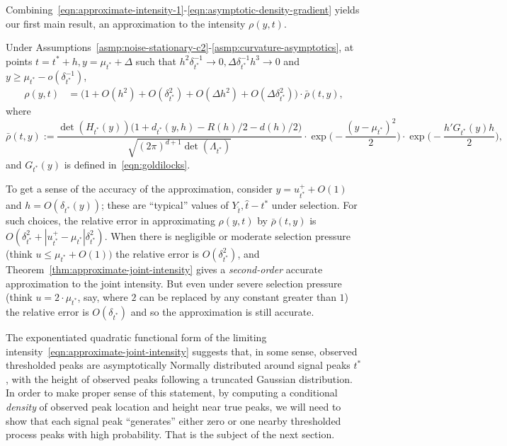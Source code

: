 \documentclass{article}
\newcommand{\ag}[1]{{\bf{{\red{[{AG: #1}]}}}}}
\begin{document}
	Combining~\eqref{eqn:approximate-intensity-1}-\eqref{eqn:asymptotic-density-gradient} yields our first main result, an approximation to the intensity $\rho(y,t)$.
	\begin{theorem}
		\label{thm:approximate-joint-intensity}
		Under Assumptions~\ref{asmp:noise-stationary-c2}-\ref{asmp:curvature-asymptotics}, at points $t = t^{\ast} + h, y = \mu_{t^*} + \Delta$ such that $h^2 \delta_{t^*}^{-1} \to 0, \Delta \delta_{t^*}^{-1}h^3 \to 0$ and $y \geq \mu_{t^*} - o(\delta_{t^*}^{-1})$,
		\begin{align*}
			\rho(y,t) & = \Big(1 + O(h^2) + O(\delta_{t^*}^2) + O(\Delta h^2) + O(\Delta\delta_{t^*}^2)\Big)\cdot\bar{\rho}(t,y),
		\end{align*}
		where
		\begin{equation}
			\label{eqn:approximate-joint-intensity}
			\bar{\rho}(t,y) := \frac{\det(H_{t^*}(y))\Big(1 + d_{t^*}(y,h) - R(h)/2 - d(h)/2\Big)}{\sqrt{(2\pi)^{d + 1}\det(\Lambda_{t^*})}}\cdot\exp\Big(-\frac{(y - \mu_{t^*})^2}{2}\Big) \cdot \exp\bigg(-\frac{h' G_{t^*}(y)h}{2}\bigg),
		\end{equation}
		and $G_{t^*}(y)$ is defined in~\eqref{eqn:goldilocks}.
	\end{theorem}
	To get a sense of the accuracy of the approximation, consider $y = u_{t^*}^{+} + O(1)$ and $h = O(\delta_{t^*}(y))$; these are ``typical'' values of $Y_{\hat{t}},\hat{t} - t^*$ under selection. For such choices, the relative error in approximating $\rho(y,t)$ by $\bar{\rho}(t,y)$ is $O(\delta_{t^*}^2 + |u_{t^*}^{+} - \mu_{t^*}| \delta_{t^*}^2)$. When there is negligible or moderate selection pressure (think $u \leq \mu_{t^*} + O(1))$ the relative error is $O(\delta_{t^*}^2)$, and Theorem~\ref{thm:approximate-joint-intensity} gives a \emph{second-order} accurate approximation to the joint intensity. But even under severe selection pressure (think $u = 2\cdot \mu_{t^*}$, say, where $2$ can be replaced by any constant greater than $1$) the relative error is $O(\delta_{t^*})$ and so the approximation is still accurate.
	
	
	The exponentiated quadratic functional form of the limiting intensity~\eqref{eqn:approximate-joint-intensity} suggests that, in some sense, observed thresholded peaks are asymptotically Normally distributed around signal peaks $t^{\ast}$, with the height of observed peaks following a truncated Gaussian distribution. In order to make proper sense of this statement, by computing a conditional \emph{density} of observed peak location and height near true peaks, we will need to show that each signal peak ``generates'' either zero or one nearby thresholded process peaks with high probability. That is the subject of the next section.
	
\end{document}
